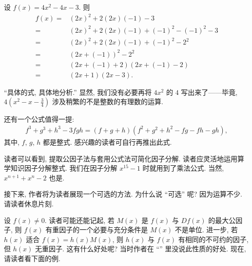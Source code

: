 \begin{example}
    设 $f(x) = 4x^2 - 4x - 3$. 则
    \begin{align*}
        f(x)
        = {} & (2x)^2 + 2 (2x) (-1) - 3                   \\
        = {} & (2x)^2 + 2 (2x) (-1) + (-1)^2 - (-1)^2 - 3 \\
        = {} & (2x)^2 + 2 (2x) (-1) + (-1)^2 - 2^2        \\
        = {} & (2x + (-1))^2 - 2^2                        \\
        = {} & (2x + (-1) + 2) (2x + (-1) - 2)            \\
        = {} & (2x + 1) (2x - 3).
    \end{align*}

    ``具体的式, 具体地分析.'' 显然, 我们没有必要再将 $4x^2$ 的 $4$ 写出来了——毕竟, $4 \left(x^2 - x - \frac{3}{4} \right)$ 涉及稍繁的不是整数的有理数的运算.
\end{example}

还有一个公式值得一提:
\begin{align*}
    f^3 + g^3 + h^3 - 3fgh = (f + g + h)(f^2 + g^2 + h^2 - fg - fh - gh),
\end{align*}
其中, $f$, $g$, $h$ 都是整式. 感兴趣的读者可自行再推出此式.

读者可以看到, 提取公因子法与套用公式法可简化因子分解. 读者应灵活地运用算学知识因子分解整式. 我们在因子分解 $x^{15} - 1$ 时就用到了乘法公式. 当然, $x^{n+1} + x^n - 2$ 也是.

接下来, 作者将为读者展现一个可选的方法. 为什么说 ``可选'' 呢? 因为运算不少. 请读者休息片刻.

\myLine

设 $f(x) \neq 0$. 读者可能还能记起, 若 $M(x)$ 是 $f(x)$ 与 $Df(x)$ 的最大公因子, 则 $f(x)$ 有重因子的一个必要与充分条件是 $M(x)$ 不是单位. 进一步, 若 $h(x)$ 适合 $f(x) = h(x)M(x)$, 则 $h(x)$ 与 $f(x)$ 有相同的不可约的因子, 但 $h(x)$ 无重因子. 这有什么好处呢? 当时作者在 ``\MultipleFactors'' 里没说此性质的好处. 现在, 请读者看下面的例.

